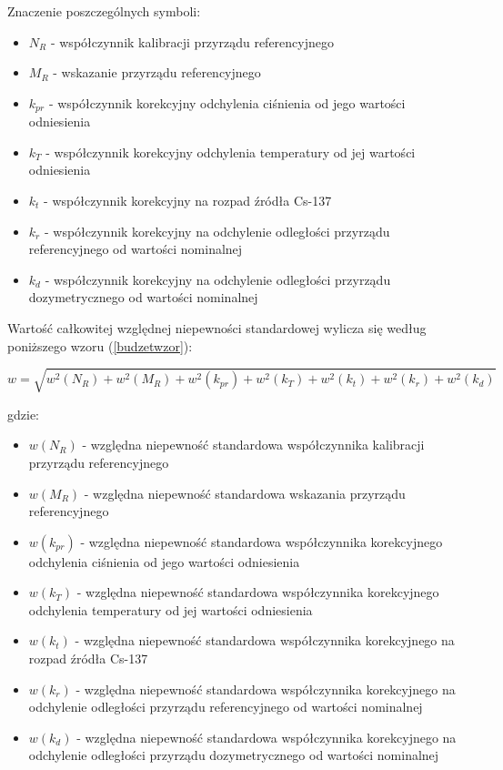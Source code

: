 Znaczenie poszczególnych symboli:
\begin{itemize}
	\item \textbf{$N_{R}$} - współczynnik kalibracji przyrządu referencyjnego
	\item \textbf{$M_{R}$} - wskazanie przyrządu referencyjnego
	\item \textbf{$k_{pr}$} - współczynnik korekcyjny odchylenia ciśnienia od jego wartości odniesienia
	\item \textbf{$k_{T}$} - współczynnik korekcyjny odchylenia temperatury od jej wartości odniesienia
	\item \textbf{$k_{t}$} - współczynnik korekcyjny na rozpad źródła Cs-137
	\item \textbf{$k_{r}$} - współczynnik korekcyjny na odchylenie odległości przyrządu referencyjnego od wartości nominalnej
	\item \textbf{$k_{d}$} - współczynnik korekcyjny na odchylenie odległości przyrządu dozymetrycznego od wartości nominalnej
\end{itemize}

Wartość całkowitej względnej niepewności standardowej wylicza się według poniższego wzoru (\ref{budzetwzor}):

\begin{equation}
	\label{budzetwzor}
	w = \sqrt{{w^2(N_{R})}+{w^2(M_{R})}+{w^2(k_{pr})}+{w^2(k_{T})}+{w^2(k_{t})}+{w^2(k_{r})}+{w^2(k_{d})}}
\end{equation}

gdzie:
\begin{itemize}
	\item \textbf{$w(N_{R})$} - względna niepewność standardowa współczynnika kalibracji przyrządu referencyjnego
	\item \textbf{$w(M_{R})$} - względna niepewność standardowa wskazania przyrządu referencyjnego
	\item \textbf{$w(k_{pr})$} - względna niepewność standardowa współczynnika korekcyjnego odchylenia ciśnienia od jego wartości odniesienia
	\item \textbf{$w(k_{T})$} - względna niepewność standardowa współczynnika korekcyjnego odchylenia temperatury od jej wartości odniesienia
	\item \textbf{$w(k_{t})$} - względna niepewność standardowa współczynnika korekcyjnego na rozpad źródła Cs-137
	\item \textbf{$w(k_{r})$} - względna niepewność standardowa współczynnika korekcyjnego na odchylenie odległości przyrządu referencyjnego od wartości nominalnej
	\item \textbf{$w(k_{d})$} - względna niepewność standardowa współczynnika korekcyjnego na odchylenie odległości przyrządu dozymetrycznego od wartości nominalnej
\end{itemize}

